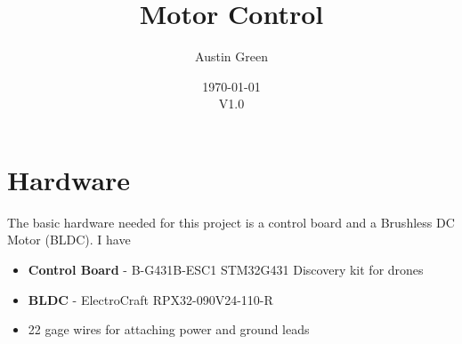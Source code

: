 \documentclass[10pt]{article}
\title{Motor Control}
\author{Austin Green}
\date{\today\\V1.0}
\begin{document}
    \begin{titlepage}
    \maketitle
    \thispagestyle{empty}
    \end{titlepage}
	
	\tableofcontents
	\newpage

	\FloatBarrier \section{Hardware}
		The basic hardware needed for this project is a control board and a Brushless DC Motor (BLDC).  I have
		\begin{itemize}
			\item \textbf{Control Board} - B-G431B-ESC1 STM32G431 Discovery kit for drones
			\item \textbf{BLDC} - ElectroCraft RPX32-090V24-110-R
			\item 22 gage wires for attaching power and ground leads
		\end{itemize}
\end{document}
